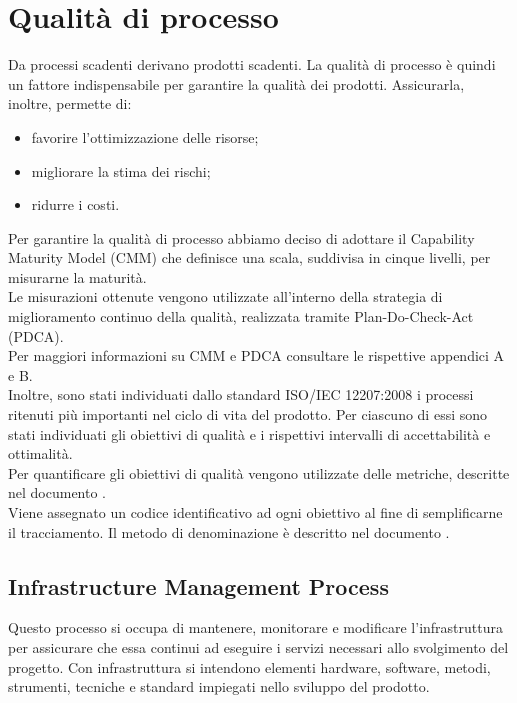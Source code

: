 \documentclass[PdQ.tex]{subfiles}
\begin{document}
\section{Qualità di processo}
	Da processi scadenti derivano prodotti scadenti. La qualità di processo è quindi un fattore
	indispensabile per garantire la qualità dei prodotti. Assicurarla, inoltre, permette di:
	\begin{itemize} 
		\item favorire l'ottimizzazione delle risorse;
		\item migliorare la stima dei rischi;
		\item ridurre i costi.
	\end{itemize}
	
	Per garantire la qualità di processo abbiamo deciso di adottare il Capability Maturity Model (CMM)
	che definisce una scala, suddivisa in cinque livelli, per misurarne la maturità. \\
	Le misurazioni ottenute vengono utilizzate all'interno della strategia di miglioramento continuo della
	qualità, realizzata tramite Plan-Do-Check-Act (PDCA). \\
	Per maggiori informazioni su CMM e PDCA consultare le rispettive appendici A e B. \\
	Inoltre, sono stati individuati dallo standard ISO/IEC 12207:2008 i processi ritenuti più importanti
	nel ciclo di vita del prodotto. Per ciascuno di essi sono stati individuati gli obiettivi di qualità
	e i rispettivi intervalli di accettabilità e ottimalità. \\
	Per quantificare gli obiettivi di qualità vengono utilizzate delle metriche, descritte nel documento
	\NPdocRP{}. \\
	Viene assegnato un codice identificativo ad ogni obiettivo al fine di semplificarne il tracciamento.
	Il metodo di denominazione è descritto nel documento \NPdocRP{}.
	
	\subsection{Infrastructure Management Process}
		Questo processo si occupa di mantenere, monitorare e modificare l'infrastruttura per assicurare
		che essa continui ad eseguire i servizi necessari allo svolgimento del progetto.
		Con infrastruttura si intendono elementi hardware, software, metodi, strumenti, tecniche e standard
		impiegati nello sviluppo del prodotto. \\
		
\end{document}
